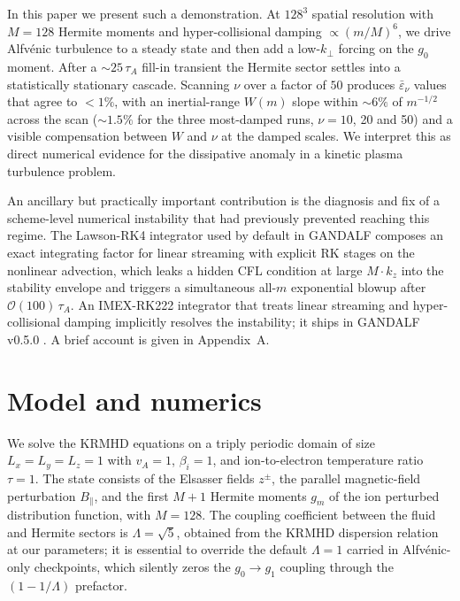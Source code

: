 \documentclass[11pt]{article}
\newcommand{\epsnu}{\varepsilon_\nu}
\newcommand{\taua}{\tau_A}
\newcommand{\kperp}{k_\perp}
\newcommand{\zpm}{z^{\pm}}
\begin{document}
In this paper we present such a demonstration. At $128^3$ spatial resolution with $M=128$ Hermite moments and hyper-collisional damping $\propto (m/M)^6$, we drive Alfv\'enic turbulence to a steady state and then add a low-$\kperp$ forcing on the $g_0$ moment. After a $\sim\!25\,\taua$ fill-in transient the Hermite sector settles into a statistically stationary cascade. Scanning $\nu$ over a factor of $50$ produces $\bar\epsnu$ values that agree to $< 1\%$, with an inertial-range $W(m)$ slope within $\sim\!6\%$ of $m^{-1/2}$ across the scan ($\sim\!1.5\%$ for the three most-damped runs, $\nu = 10$, 20 and 50) and a visible compensation between $W$ and $\nu$ at the damped scales. We interpret this as direct numerical evidence for the dissipative anomaly in a kinetic plasma turbulence problem.

An ancillary but practically important contribution is the diagnosis and fix of a scheme-level numerical instability that had previously prevented reaching this regime. The Lawson-RK4 integrator used by default in GANDALF composes an exact integrating factor for linear streaming with explicit RK stages on the nonlinear advection, which leaks a hidden CFL condition at large $M \cdot k_z$ into the stability envelope and triggers a simultaneous all-$m$ exponential blowup after $\mathcal{O}(100)\,\taua$. An IMEX-RK222 integrator \citep{ascher1997} that treats linear streaming and hyper-collisional damping implicitly resolves the instability; it ships in GANDALF v0.5.0 \citep{gandalf}. A brief account is given in Appendix~A.

\section{Model and numerics}
\label{sec:model}

We solve the KRMHD equations \citep{schekochihin2009} on a triply periodic domain of size $L_x = L_y = L_z = 1$ with $v_A = 1$, $\beta_i = 1$, and ion-to-electron temperature ratio $\tau = 1$. The state consists of the Elsasser fields $\zpm$, the parallel magnetic-field perturbation $B_\parallel$, and the first $M+1$ Hermite moments $g_m$ of the ion perturbed distribution function, with $M=128$. The coupling coefficient between the fluid and Hermite sectors is $\Lambda = \sqrt{5}$, obtained from the KRMHD dispersion relation at our parameters; it is essential to override the default $\Lambda = 1$ carried in Alfv\'enic-only checkpoints, which silently zeros the $g_0 \to g_1$ coupling through the $(1 - 1/\Lambda)$ prefactor.
\end{document}
